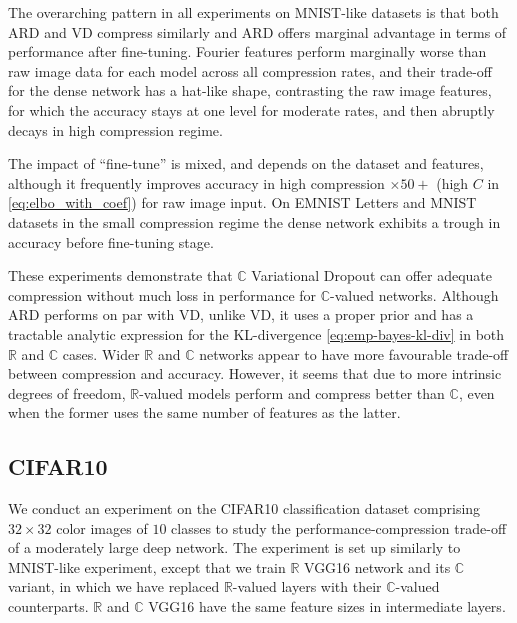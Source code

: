 \documentclass[a4paper,10pt,onecolumn]{article}
\newcommand{\real}{\mathbb{R}}
\newcommand{\cplx}{\mathbb{C}}
\begin{document}
The overarching pattern in all experiments on MNIST-like datasets is that both ARD and VD
compress similarly and ARD offers marginal advantage in terms of performance after fine-tuning.
Fourier features perform marginally worse than raw image data for each model across all
compression rates, and their trade-off for the dense network has a hat-like shape, contrasting
the raw image features, for which the accuracy stays at one level for moderate rates,
and then abruptly decays in high compression regime.

The impact of ``fine-tune'' is mixed, and depends on the dataset and features, although it
frequently improves accuracy in high compression $\times50+$ (high $C$ in \eqref{eq:elbo_with_coef})
for raw image input. On EMNIST Letters and MNIST datasets in the small compression regime the
dense network exhibits a trough in accuracy before fine-tuning stage.

These experiments demonstrate that $\cplx$ Variational Dropout can offer adequate compression
without much loss in performance for $\cplx$-valued networks. Although ARD performs on par
with VD, unlike VD, it uses a proper prior and has a tractable analytic expression for the
KL-divergence \eqref{eq:emp-bayes-kl-div} in both $\real$ and $\cplx$ cases.
Wider $\real$ and $\cplx$ networks appear to have more favourable trade-off between
compression and accuracy.
However, it seems that due to more intrinsic degrees of freedom, $\real$-valued models
perform and compress better than $\cplx$, even when the former uses the same number of
features as the latter.



\subsection{CIFAR10} %
\label{sub:cifar10}

We conduct an experiment on the CIFAR10 classification dataset \citep{krizhevsky_learning_2009}
comprising $32\times 32$ color images of $10$ classes to study the performance-compression
trade-off of a moderately large deep network.
The experiment is set up similarly to MNIST-like experiment, except that we train $\real$
VGG16 network \citep{simonyan_very_2015} and its $\cplx$ variant, in which we have replaced
$\real$-valued layers with their $\cplx$-valued counterparts. $\real$ and $\cplx$ VGG16 have
the same feature sizes in intermediate layers.
\end{document}
